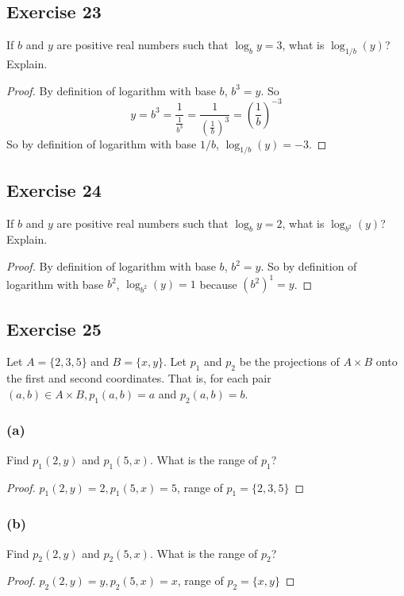 \documentclass[14pt]{extarticle}
\begin{document}
\subsection{Exercise 23}
If $b$ and $y$ are positive real numbers such that \(\log_b y = 3\), what is \(\log_{1/b}(y)\)? Explain.

\begin{proof}
By definition of logarithm with base $b$, \(b^3 = y\). So
\[
y = b^3 = \frac{1}{\frac{1}{b^3}} = \frac{1}{\left(\frac{1}{b}\right)^3} = \left(\frac{1}{b}\right)^{-3}
\]
So by definition of logarithm with base $1/b$, \(\log_{1/b}(y) = -3\).
\end{proof}

\subsection{Exercise 24}
If $b$ and $y$ are positive real numbers such that \(\log_b y = 2\), what is \(\log_{b^2}(y)\)? Explain.

\begin{proof}
By definition of logarithm with base $b$, \(b^2 = y\). So
by definition of logarithm with base $b^2$, 
\(\log_{b^2}(y) = 1\) because \((b^2)^1 = y\).
\end{proof}

\subsection{Exercise 25}
Let \(A = \{2, 3, 5\}\) and \(B = \{x, y\}\). Let $p_1$ and $p_2$ be the projections of \(A \times B\) onto the first 
and second coordinates. That is, for each pair \((a, b) \in A \times B, p_1(a, b) = a\) and \(p_2(a, b) = b\).

\subsubsection{(a)}
Find \(p_1(2, y)\) and \(p_1(5, x)\). What is the range of $p_1$?

\begin{proof}
\(p_1(2, y) = 2, p_1(5, x) = 5\), range of \(p_1 = \{2, 3, 5\}\)
\end{proof}

\subsubsection{(b)}
Find \(p_2(2, y)\) and \(p_2(5, x)\). What is the range of $p_2$?

\begin{proof}
\(p_2(2, y) = y, p_2(5, x) = x\), range of \(p_2 = \{x, y\}\)
\end{proof}
\end{document}
